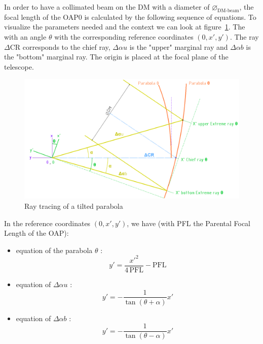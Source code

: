 \documentclass[12pt,a4paper]{article}
\begin{document}
In order to have a collimated beam on the DM with a diameter of $\diameter_{\text{DM-beam}}$, the focal length of the OAP0 is calculated by the following sequence of equations. To visualize the parameters needed and the context we can look at figure~\ref{fig:sketch_ray_tracing_OAP0}. The with an angle $\theta$ with the corresponding reference coordinates $\left(0,x',y'\right)$. The ray $\Delta$CR corresponds to the chief ray, $\Delta\alpha u$ is the "upper" marginal ray and $\Delta\alpha b$ is the "bottom" marginal ray. The origin is placed at the focal plane of the telescope.

\begin{figure}[H]
	\begin{center}
		\includegraphics[width=.8\textwidth]{images/sketch_ray_tracing_OAP0.PNG}
		\caption{Ray tracing of a tilted parabola}\label{fig:sketch_ray_tracing_OAP0}
	\end{center}
\end{figure}
In the reference coordinates $\left(0,x',y'\right)$, we have (with PFL the Parental Focal Length of the OAP):
\begin{itemize}
	\item equation of the parabola $\theta$ : 
	\begin{equation}
	y' = \frac{x'^2}{4\,\text{PFL}}-\text{PFL}	\label{eq:parabola_theta}
	\end{equation}
	\item equation of $\Delta\alpha u$ : \begin{equation}
	y' = -\frac{1}{\tan\left(\theta+\alpha\right)}x' \label{eq:delta_alphau}
	\end{equation}
	\item equation of $\Delta\alpha b$ : \begin{equation}
	y' = -\frac{1}{\tan\left(\theta-\alpha\right)}x' \label{eq:delta_alphab}
	\end{equation}
\end{itemize}
%
\end{document}
